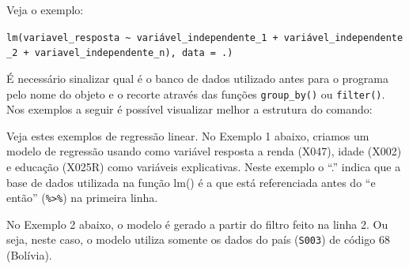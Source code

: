 \documentclass[
  10pt,
  brazil,
  a4paper,
  twoside, notitlepage, openright]{book}
\newenvironment{Shaded}{\begin{snugshade}}{\end{snugshade}}
\newcommand{\CommentTok}[1]{\textcolor[rgb]{0.56,0.35,0.01}{\textit{#1}}}
\newcommand{\DataTypeTok}[1]{\textcolor[rgb]{0.13,0.29,0.53}{#1}}
\newcommand{\DecValTok}[1]{\textcolor[rgb]{0.00,0.00,0.81}{#1}}
\newcommand{\KeywordTok}[1]{\textcolor[rgb]{0.13,0.29,0.53}{\textbf{#1}}}
\newcommand{\NormalTok}[1]{#1}
\newcommand{\OperatorTok}[1]{\textcolor[rgb]{0.81,0.36,0.00}{\textbf{#1}}}
\newcommand{\StringTok}[1]{\textcolor[rgb]{0.31,0.60,0.02}{#1}}
\begin{document}
Veja o exemplo:

\texttt{lm(variavel\_resposta\ \textasciitilde{}\ variável\_independente\_1\ +\ variável\_independente\_2\ +\ variavel\_independente\_n),\ data\ =\ .)}

É necessário sinalizar qual é o banco de dados utilizado antes para o programa pelo nome do objeto e o recorte através das funções \texttt{group\_by()} ou \texttt{filter()}. Nos exemplos a seguir é possível visualizar melhor a estrutura do comando:

Veja estes exemplos de regressão linear. No Exemplo 1 abaixo, criamos um modelo de regressão usando como variável resposta a renda (X047), idade (X002) e educação (X025R) como variáveis explicativas. Neste exemplo o ``.'' indica que a base de dados utilizada na função lm() é a que está referenciada antes do ``e então'' (\texttt{\%\textgreater{}\%}) na primeira linha.

\begin{Shaded}
\end{Shaded}

No Exemplo 2 abaixo, o modelo é gerado a partir do filtro feito na linha 2. Ou seja, neste caso, o modelo utiliza somente os dados do país (\texttt{S003}) de código 68 (Bolívia).

\begin{Shaded}
\end{Shaded}
\end{document}
